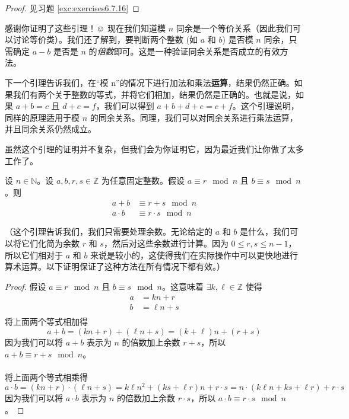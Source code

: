 \begin{proof}
    见习题 \ref{exc:exercises6.7.16}
\end{proof}

感谢你证明了这些引理！$\smiley{}$ 现在我们知道模 $n$ 同余是一个等价关系（因此我们可以讨论等价类）。我们还了解到，要判断两个整数 (如 $a$ 和 $b$) 是否模 $n$ 同余，只需确定 $a - b$ 是否是 $n$ 的\emph{倍数}即可。这是一种验证同余关系是否成立的有效方法。

下一个引理告诉我们，在``模 n''的情况下进行加法和乘法\textbf{运算}，结果仍然正确。如果我们有两个关于整数的等式，并将它们相加，结果仍然是正确的。也就是说，如果 $a + b = c$ 且 $d + e = f$，我们可以得到 $a + b + d + e = c + f$。这个引理说明，同样的原理适用于模 $n$ 的同余关系。同理，我们可以对同余关系进行乘法运算，并且同余关系仍然成立。

虽然这个引理的证明并不复杂，但我们会为你证明它，因为最近我们让你做了太多工作了。

\begin{lemma}\label{lemma6.5.10}
    设 $n \in \mathbb{N}$。设 $a,b,r,s \in \mathbb{Z}$ 为任意固定整数。假设 $a \equiv r \mod n$ 且 $b \equiv s \mod n$。则
    \begin{align*}
        a + b &\equiv r + s \mod n \\
        a \cdot b &\equiv r \cdot s \mod n
    \end{align*}
\end{lemma}

（这个引理告诉我们，我们只需要处理余数。无论给定的 $a$ 和 $b$ 是什么，我们可以将它们化简为余数 $r$ 和 $s$，然后对这些余数进行计算。因为 $0 \le r, s \le n - 1$，所以它们相对于 $a$ 和 $b$ 来说是较小的，这使得我们在实际操作中可以更快地进行算术运算。以下证明保证了这种方法在所有情况下都有效。）

\begin{proof}
    假设 $a \equiv r \mod n$ 且 $b \equiv s \mod n$。这意味着 $\exists k, \ell \in \mathbb{Z}$ 使得
    \begin{align*}
        a &= kn + r \\
        b &= \ell n + s \\
    \end{align*}
    将上面两个等式相加得
    \[a + b = (kn + r) + (\ell n + s) = (k + \ell)n + (r + s)\]
    因为我们可以将 $a+b$ 表示为 $n$ 的倍数加上余数 $r+s$，所以 $a + b \equiv r + s \mod n$。\\ \\
    将上面两个等式相乘得
    \[a \cdot b =  (kn + r) \cdot (\ell n + s) = k\ell n^2 + (ks + \ell r)n + r \cdot s = n \cdot (k\ell n + ks + \ell r)+r \cdot s\]
    因为我们可以将 $a \cdot b$ 表示为 $n$ 的倍数加上余数 $r \cdot s$，所以 $a \cdot b \equiv r \cdot s \mod n$。
\end{proof}

